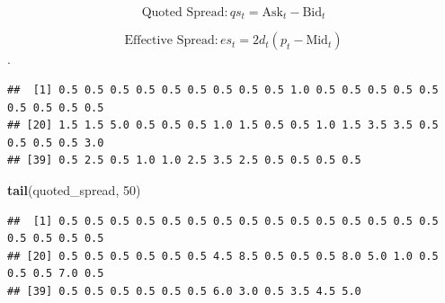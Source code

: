 \documentclass[
]{article}
\newenvironment{Shaded}{\begin{snugshade}}{\end{snugshade}}
\newcommand{\CommentTok}[1]{\textcolor[rgb]{0.56,0.35,0.01}{\textit{#1}}}
\newcommand{\DecValTok}[1]{\textcolor[rgb]{0.00,0.00,0.81}{#1}}
\newcommand{\FunctionTok}[1]{\textcolor[rgb]{0.13,0.29,0.53}{\textbf{#1}}}
\newcommand{\NormalTok}[1]{#1}
\newcommand{\OtherTok}[1]{\textcolor[rgb]{0.56,0.35,0.01}{#1}}
\newcommand{\SpecialCharTok}[1]{\textcolor[rgb]{0.81,0.36,0.00}{\textbf{#1}}}
\begin{document}
\[\text{Quoted Spread}: qs_t = \text{Ask}_t - \text{Bid}_t\]

\[\text{Effective Spread}: es_t = 2d_t(p_t - \text{Mid}_t)\].

\begin{Shaded}
\end{Shaded}

\begin{verbatim}
##  [1] 0.5 0.5 0.5 0.5 0.5 0.5 0.5 0.5 0.5 1.0 0.5 0.5 0.5 0.5 0.5 0.5 0.5 0.5 0.5
## [20] 1.5 1.5 5.0 0.5 0.5 0.5 1.0 1.5 0.5 0.5 1.0 1.5 3.5 3.5 0.5 0.5 0.5 0.5 3.0
## [39] 0.5 2.5 0.5 1.0 1.0 2.5 3.5 2.5 0.5 0.5 0.5 0.5
\end{verbatim}

\begin{Shaded}
\begin{Highlighting}[]
\FunctionTok{tail}\NormalTok{(quoted\_spread, }\DecValTok{50}\NormalTok{)}
\end{Highlighting}
\end{Shaded}

\begin{verbatim}
##  [1] 0.5 0.5 0.5 0.5 0.5 0.5 0.5 0.5 0.5 0.5 0.5 0.5 0.5 0.5 0.5 0.5 0.5 0.5 0.5
## [20] 0.5 0.5 0.5 0.5 0.5 0.5 4.5 8.5 0.5 0.5 0.5 8.0 5.0 1.0 0.5 0.5 0.5 7.0 0.5
## [39] 0.5 0.5 0.5 0.5 0.5 0.5 6.0 3.0 0.5 3.5 4.5 5.0
\end{verbatim}
\end{document}

